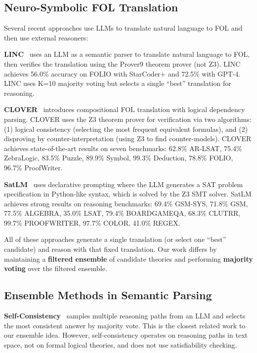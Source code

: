 \documentclass[11pt,letterpaper]{article}
\begin{document}
\subsection{Neuro-Symbolic FOL Translation}

Several recent approaches use LLMs to translate natural language to FOL and then use external reasoners:

\textbf{LINC}~\cite{Olausson2023} uses an LLM as a semantic parser to translate natural language to FOL, then verifies the translation using the Prover9 theorem prover (not Z3). LINC achieves 56.0\% accuracy on FOLIO with StarCoder+ and 72.5\% with GPT-4. LINC uses K=10 majority voting but selects a single ``best'' translation for reasoning.

\textbf{CLOVER}~\cite{Ryu2025} introduces compositional FOL translation with logical dependency parsing. CLOVER uses the Z3 theorem prover for verification via two algorithms: (1) logical consistency (selecting the most frequent equivalent formulas), and (2) disproving by counter-interpretation (using Z3 to find counter-models). CLOVER achieves state-of-the-art results on seven benchmarks: 62.8\% AR-LSAT, 75.4\% ZebraLogic, 83.5\% Puzzle, 89.9\% Symbol, 99.3\% Deduction, 78.8\% FOLIO, 96.7\% ProofWriter.

\textbf{SatLM}~\cite{Ye2023} uses declarative prompting where the LLM generates a SAT problem specification in Python-like syntax, which is solved by the Z3 SMT solver. SatLM achieves strong results on reasoning benchmarks: 69.4\% GSM-SYS, 71.8\% GSM, 77.5\% ALGEBRA, 35.0\% LSAT, 79.4\% BOARDGAMEQA, 68.3\% CLUTRR, 99.7\% PROOFWRITER, 97.7\% COLOR, 41.0\% REGEX.

All of these approaches generate a single translation (or select one ``best'' candidate) and reason with that fixed translation. Our work differs by maintaining a \textbf{filtered ensemble} of candidate theories and performing \textbf{majority voting} over the filtered ensemble.

\subsection{Ensemble Methods in Semantic Parsing}

\textbf{Self-Consistency}~\cite{Wang2023} samples multiple reasoning paths from an LLM and selects the most consistent answer by majority vote. This is the closest related work to our ensemble idea. However, self-consistency operates on reasoning paths in text space, not on formal logical theories, and does not use satisfiability checking.
\end{document}
